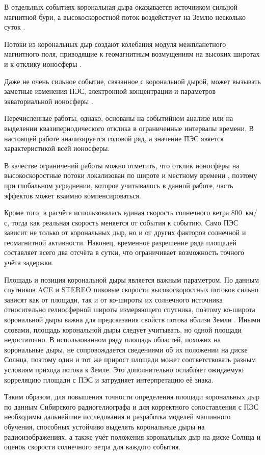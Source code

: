 \documentclass[11pt,a4paper]{article}
\begin{document}
В отдельных событиях
корональная дыра оказывается источником сильной магнитной бури, а
высокоскоростной поток воздействует на Землю несколько суток
\citep{shimeis2012signature}. 

Потоки из корональных дыр создают колебания
модуля межпланетного магнитного поля, приводящие к геомагнитным возмущениям
на высоких широтах и к отклику ионосферы \citep{liu2019analyzing}. 

Даже не очень сильное событие, связанное с корональной дырой, может вызывать заметные
изменения ПЭС, электронной концентрации и параметров экваториальной
ионосферы \citep{younas2022ionospheric}.


Перечисленные работы, однако, основаны на событийном анализе или на
выделении квазипериодического отклика в ограниченные интервалы времени.
В настоящей работе анализируется годовой ряд, а значение ПЭС явяется характеристикой
всей ионосферы. 

В качестве ограничений работы можно отметить, что отклик ионосферы на высокоскоростные потоки локализован
по широте и местному времени \citep{liu2019analyzing,tulasiram2010periodic},
поэтому при глобальном усреднении, которое учитывалось в данной работе, 
часть эффектов может взаимно
компенсироваться. 


Кроме того, в расчёте использовалась единая скорость
солнечного ветра 800~км/с, тогда как реальная скорость меняется от события
к событию. Само ПЭС зависит не только от корональных дыр, но и от других
факторов солнечной и геомагнитной активности. Наконец, временное разрешение
ряда площадей составляет всего два отсчёта в сутки, что ограничивает
возможность точного учёта задержки.

Площадь и позиция корональной дыры является важным параметром. По данным спутников
ACE и STEREO пиковые скорости высокоскоростных потоков сильно зависят как
от площади, так и от ко-широты их солнечного источника относительно
гелиосферной широты измеряющего спутника, поэтому ко-широта корональной
дыры важна для предсказания свойств потока вблизи Земли
\citep{hofmeister2018dependence}. Иными словами, площадь корональной дыры
следует учитывать, но одной площади недостаточно. 
В использованном ряду площадь областей, похожих на корональные дыры,
не сопровождается сведениями об их положении на диске Солнца, поэтому один
и тот же прирост площади может соответствовать разным условиям прихода
потока к Земле. Это дополнительно ослабляет ожидаемую корреляцию площади
с ПЭС и затрудняет интерпретацию её знака.

Таким образом, для повышения точности определения площади корональных дыр
по данным Сибирского радиогелиографа и для корректного сопоставления с ПЭС
необходимы дальнейшие исследования и разработка моделей машинного обучения,
способных устойчиво выделять корональные дыры на радиоизображениях, а также
учёт положения корональных дыр на диске Солнца и оценок скорости солнечного
ветра для каждого события.
\end{document}
